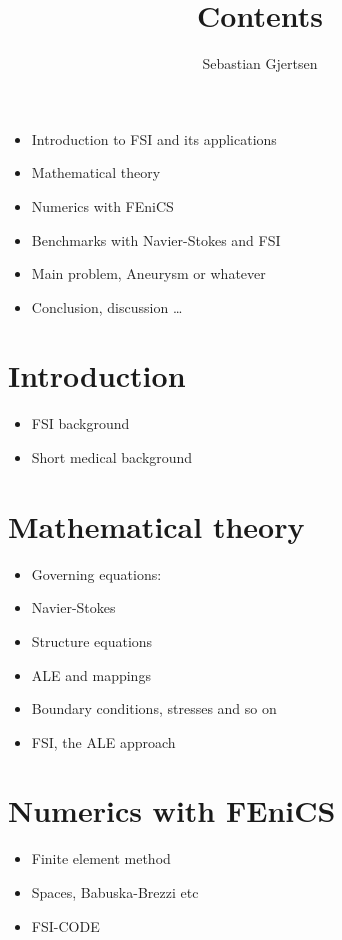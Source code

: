 
\usepackage{listings}
\usepackage{amsmath}
\title{Contents}
\author{Sebastian Gjertsen}

\maketitle

\begin{itemize}  
\item Introduction to FSI and its applications
\item Mathematical theory 
\item Numerics with FEniCS
\item Benchmarks with Navier-Stokes and FSI
\item Main problem, Aneurysm or whatever
\item Conclusion, discussion \ldots 
\end{itemize}

\section{Introduction}
\begin{itemize}
\item FSI background 
\item Short medical background
\end{itemize}

\section{Mathematical theory}
\begin{itemize}
\item Governing equations:
\item Navier-Stokes
\item Structure equations
\item ALE and mappings
\item Boundary conditions, stresses and so on
\item FSI, the ALE approach
\end{itemize}

\section{Numerics with FEniCS}
\begin{itemize}
\item Finite element method
\item Spaces, Babuska-Brezzi etc
\item FSI-CODE
\end{itemize}

